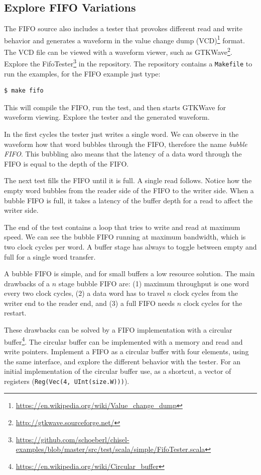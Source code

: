\documentclass[%
    10pt,
    headinclude, footexclude,
    openright, %
    notitlepage,
    cleardoubleempty,
    headsepline,
    pointlessnumbers,
    bibtotoc, idxtotoc,
    ]{scrbook}
\newcommand{\code}[1]{{\small{\texttt{#1}}}}
\newcommand{\myref}[2]{\href{#1}{#2}}
\renewcommand{\myref}[2]{{#2}{\footnote{\url{#1}}}}
\begin{document}
\subsection{Explore FIFO Variations}

The FIFO source also includes a tester that provokes different read and write behavior and generates a waveform in the 
\myref{https://en.wikipedia.org/wiki/Value_change_dump}{value change dump (VCD)} format.
The VCD file can be viewed with a waveform viewer, such as
\myref{http://gtkwave.sourceforge.net/}{GTKWave}.
Explore the
\myref{https://github.com/schoeberl/chisel-examples/blob/master/src/test/scala/simple/FifoTester.scala}{FifoTester} in the repository.
The repository contains a \code{Makefile} to run the examples, for the FIFO example
just type:
\begin{verbatim}
$ make fifo
\end{verbatim}
This will compile the FIFO, run the test, and then starts GTKWave for waveform
viewing. Explore the tester and the generated waveform.

In the first cycles the tester just writes a single word. We can observe in
the waveform how that word bubbles through the FIFO, therefore the
name \emph{bubble FIFO}. This bubbling also means that the
latency of a data word through the FIFO is equal to the depth of the FIFO.

The next test fills the FIFO until it is full. A single read follows.
Notice how the empty word bubbles from the reader side of the FIFO
to the writer side. When a bubble FIFO is full, it takes
a latency of the buffer depth for a read to affect the writer side. 

The end of the test contains a loop that tries to write and read at maximum speed.
We can see the bubble FIFO running at maximum bandwidth, which is two
clock cycles per word. A buffer stage has always to toggle between empty
and full for a single word transfer.

A bubble FIFO is simple, and for small buffers a low resource solution.
The main drawbacks of a $n$ stage bubble FIFO are: (1) maximum throughput is
one word every two clock cycles, (2) a data word has to travel $n$ clock cycles
from the writer end to the reader end, and (3) a full FIFO needs $n$ clock cycles
for the restart.

These drawbacks can be solved by a FIFO implementation with a
\myref{https://en.wikipedia.org/wiki/Circular_buffer}{circular buffer}.
The circular buffer can be implemented with a memory and
read and write pointers.
Implement a FIFO as a circular buffer with four elements, using the same
interface, and explore the different behavior with the tester.
For an initial implementation of the circular buffer use, as a shortcut,
a vector of registers (\code{Reg(Vec(4, UInt(size.W)))}).
\end{document}
